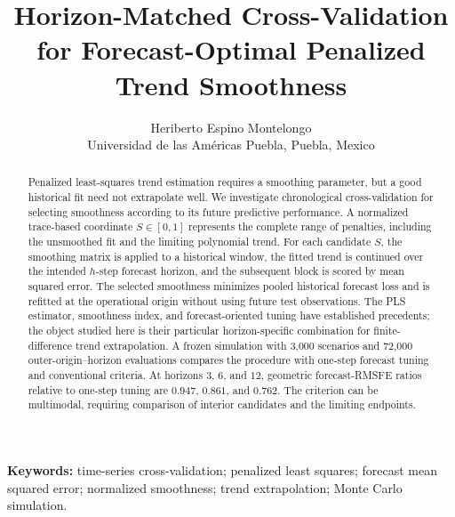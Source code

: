 \documentclass[11pt]{article}
\begin{document}
\title{Horizon-Matched Cross-Validation for Forecast-Optimal Penalized Trend Smoothness}

\author{Heriberto Espino Montelongo\\
Universidad de las Am\'ericas Puebla, Puebla, Mexico}
\date{}

\maketitle

\begin{abstract}
Penalized least-squares trend estimation requires a smoothing
parameter, but a good historical fit need not extrapolate well.
We investigate chronological cross-validation for selecting
smoothness according to its future predictive performance.
A normalized trace-based coordinate $S\in[0,1]$ represents
the complete range of penalties, including the unsmoothed fit
and the limiting polynomial trend. For each candidate $S$,
the smoothing matrix is applied to a historical window,
the fitted trend is continued over the intended $h$-step
forecast horizon, and the subsequent block is scored by
mean squared error. The selected smoothness minimizes pooled
historical forecast loss and is refitted at the operational
origin without using future test observations. The PLS
estimator, smoothness index, and forecast-oriented tuning
have established precedents; the object studied here is
their particular horizon-specific combination for
finite-difference trend extrapolation. A frozen simulation
with 3,000 scenarios and 72,000 outer-origin--horizon
evaluations compares the procedure with one-step forecast
tuning and conventional criteria. At horizons $3$, $6$,
and $12$, geometric forecast-RMSFE ratios relative to
one-step tuning are $0.947$, $0.861$, and $0.762$.
The criterion can be multimodal, requiring comparison
of interior candidates and the limiting endpoints.
\end{abstract}

\noindent\textbf{Keywords:} time-series cross-validation; penalized least squares; forecast mean squared error; normalized smoothness; trend extrapolation; Monte Carlo simulation.

\medskip










\end{document}
